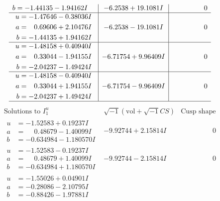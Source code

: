 \documentclass[1p]{elsarticle_modified}
\theoremstyle{definition}
\newcommand{\I}{\sqrt{-1}}
\begin{document}
$$\begin{array}{c|c|c}
\begin{aligned}
b &= -1.44135 - 1.94162 I\end{aligned}
 & -6.2538 + 19.1081 I & \phantom{-0.000000 } 0 \\ \hline\begin{aligned}
u &= -1.47646 - 0.38036 I \\
a &= \phantom{-}0.69606 + 2.10476 I \\
b &= -1.44135 + 1.94162 I\end{aligned}
 & -6.2538 - 19.1081 I & \phantom{-0.000000 } 0 \\ \hline\begin{aligned}
u &= -1.48158 + 0.40940 I \\
a &= \phantom{-}0.33044 - 1.94155 I \\
b &= -2.04237 - 1.49424 I\end{aligned}
 & -6.71754 + 9.96409 I & \phantom{-0.000000 } 0 \\ \hline\begin{aligned}
u &= -1.48158 - 0.40940 I \\
a &= \phantom{-}0.33044 + 1.94155 I \\
b &= -2.04237 + 1.49424 I\end{aligned}
 & -6.71754 - 9.96409 I & \phantom{-0.000000 } 0\\
 \hline 
 \end{array}$$\newpage$$\begin{array}{c|c|c}  
\text{Solutions to }I^u_{1}& \I (\text{vol} + \sqrt{-1}CS) & \text{Cusp shape}\\
 \hline 
\begin{aligned}
u &= -1.52583 + 0.19237 I \\
a &= \phantom{-}0.48679 - 1.40099 I \\
b &= -0.634984 - 1.180570 I\end{aligned}
 & -9.92744 + 2.15814 I & \phantom{-0.000000 } 0 \\ \hline\begin{aligned}
u &= -1.52583 - 0.19237 I \\
a &= \phantom{-}0.48679 + 1.40099 I \\
b &= -0.634984 + 1.180570 I\end{aligned}
 & -9.92744 - 2.15814 I & \phantom{-0.000000 } 0 \\ \hline\begin{aligned}
u &= -1.55026 + 0.04901 I \\
a &= -0.28086 - 2.10795 I \\
b &= -0.88426 - 1.97881 I\end{aligned}

\end{array}$$
\end{document}
